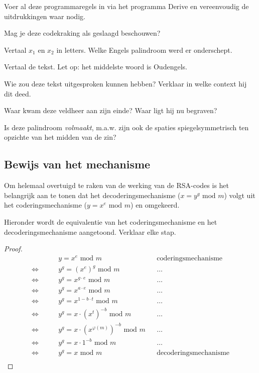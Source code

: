 \begin{oef}
Voer al deze programmaregels in via het programma Derive en vereenvoudig de uitdrukkingen waar nodig.

\begin{enumoef}
\item Mag je deze codekraking als geslaagd beschouwen?
\item Vertaal $x_1$ en $x_2$ in letters. Welke Engels palindroom werd er onderschept.
\item Vertaal de tekst. Let op: het middelste woord is Oudengels.
\item Wie zou deze tekst uitgesproken kunnen hebben? Verklaar in welke context hij dit deed.
\item Waar kwam deze veldheer aan zijn einde? Waar ligt hij nu begraven?
\item Is deze palindroom \emph{volmaakt}, m.a.w. zijn ook de spaties spiegelsymmetrisch ten opzichte van het midden van de zin?
\end{enumoef}
\end{oef}

\subsection{Bewijs van het mechanisme}

Om helemaal overtuigd te raken van de werking van de RSA-codes is het belangrijk aan te tonen dat het decoderingsmechanisme ($x=y^g \textrm{ mod } m$) volgt uit het coderingsmechanisme ($y=x^e\textrm{ mod } m$) en omgekeerd.

\begin{oef}
Hieronder wordt de equivalentie van het coderingsmechanisme en het decoderingsmechanisme aangetoond. Verklaar elke stap.
\end{oef}

\begin{proof}
\begin{align*}
& y=x^e \textrm{ mod }m&&\textrm{coderingsmechanisme}\\
\Leftrightarrow \qquad & y^g=(x^e)^g \textrm{ mod }m&&\dots\\
\Leftrightarrow \qquad & y^g=x^{g \cdot e} \textrm{ mod }m&&\dots\\
\Leftrightarrow \qquad & y^g=x^{a \cdot e} \textrm{ mod }m&&\dots\\
\Leftrightarrow \qquad & y^g=x^{1-b \cdot t} \textrm{ mod }m&&\dots\\
\Leftrightarrow \qquad & y^g=x\cdot (x^t)^{-b} \textrm{ mod }m&&\dots\\
\Leftrightarrow \qquad & y^g=x\cdot (x^{\varphi(m)})^{-b} \textrm{ mod }m&&\dots\\
\Leftrightarrow \qquad & y^g=x\cdot 1^{-b} \textrm{ mod }m&&\dots\\
\Leftrightarrow \qquad & y^g=x\textrm{ mod }m&&\textrm{decoderingsmechanisme}\\
\end{align*}
\end{proof}


